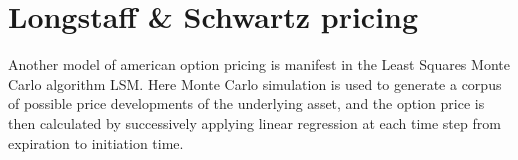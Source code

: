 \section{Longstaff \& Schwartz pricing}

Another model of american option pricing is manifest in the Least
Squares Monte Carlo algorithm LSM. Here Monte Carlo simulation is used
to generate a corpus of possible price developments of the underlying
asset, and the option price is then calculated by successively
applying linear regression at each time step from expiration to
initiation time.



